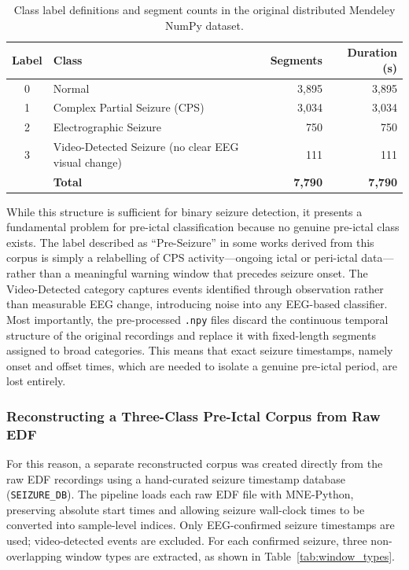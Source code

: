 \documentclass[12pt, a4paper]{report}
\begin{document}
\begin{table}[H]
  \centering
  \caption{Class label definitions and segment counts in the original
           distributed Mendeley NumPy dataset.}
  \label{tab:mendeley_labels}
  \small
  \renewcommand{\arraystretch}{1.15}
  \begin{tabularx}{0.95\linewidth}{c>{\raggedright\arraybackslash}Xrr}
    \toprule
    \textbf{Label} & \textbf{Class} & \textbf{Segments} & \textbf{Duration (s)} \\
    \midrule
    0 & Normal & 3{,}895 & 3{,}895 \\
    1 & Complex Partial Seizure (CPS) & 3{,}034 & 3{,}034 \\
    2 & Electrographic Seizure & 750 & 750 \\
    3 & Video-Detected Seizure (no clear EEG visual change) & 111 & 111 \\
    \midrule
      & \textbf{Total} & \textbf{7{,}790} & \textbf{7{,}790} \\
    \bottomrule
  \end{tabularx}
\end{table}

\noindent While this structure is sufficient for binary seizure detection,
it presents a fundamental problem for pre-ictal classification because no
genuine pre-ictal class exists. The label described as ``Pre-Seizure'' in
some works derived from this corpus is simply a relabelling of CPS
activity---ongoing ictal or peri-ictal data---rather than a meaningful
warning window that precedes seizure onset. The Video-Detected category
captures events identified through observation rather than measurable EEG
change, introducing noise into any EEG-based classifier. Most importantly,
the pre-processed \texttt{.npy} files discard the continuous temporal
structure of the original recordings and replace it with fixed-length
segments assigned to broad categories. This means that exact seizure
timestamps, namely onset and offset times, which are needed to isolate a
genuine pre-ictal period, are lost entirely.

\subsubsection*{Reconstructing a Three-Class Pre-Ictal Corpus from Raw EDF}

For this reason, a separate reconstructed corpus was created directly from
the raw EDF recordings using a hand-curated seizure timestamp database
(\texttt{SEIZURE\_DB}). The pipeline loads each raw EDF file with
MNE-Python, preserving absolute start times and allowing seizure
wall-clock times to be converted into sample-level indices. Only
EEG-confirmed seizure timestamps are used; video-detected events are
excluded. For each confirmed seizure, three non-overlapping window types
are extracted, as shown in Table~\ref{tab:window_types}.
\end{document}
